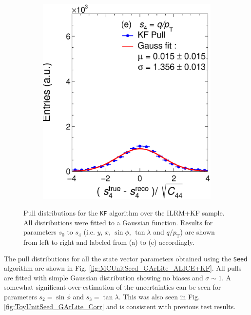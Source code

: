 \begin{figure}[t]
\begin{subfigure}{0.32\textwidth}
         \includegraphics[width=\textwidth]{figures/ch4-KF_NDGArLite/MC/ILRM+KF/UnitKFEnd_p4.eps}
         \caption{}
         \label{fig:resp4KF_GArLite_ILRM+KF}
     \end{subfigure}
        \caption{Pull distributions for the \texttt{KF} algorithm over the ILRM+KF sample. All distributions were fitted to a Gaussian function. Results for parameters $s_0$ to $s_4$ (i.e. $y$, $x$, $\sin\phi$, $\tan\lambda$ and $q/p_{\text{T}}$) are shown from left to right and labeled from (a) to (e) accordingly. }
        \label{fig:MCUnitKFEnd_GArLite_ILRM+KF}
\end{figure}

The pull distributions for all the state vector parameters obtained using the \texttt{Seed} algorithm are shown in Fig. \ref{fig:MCUnitSeed_GArLite_ALICE+KF}. All pulls are fitted with simple Gaussian distribution showing no biases and $\sigma\sim1$. A somewhat significant over-estimation of the uncertainties can be seen for parameters $s_2=\sin\phi$ and $s_3=\tan\lambda$. This was also seen in Fig. \ref{fig:ToyUnitSeed_GArLite_Corr} and is consistent with previous test results. 


